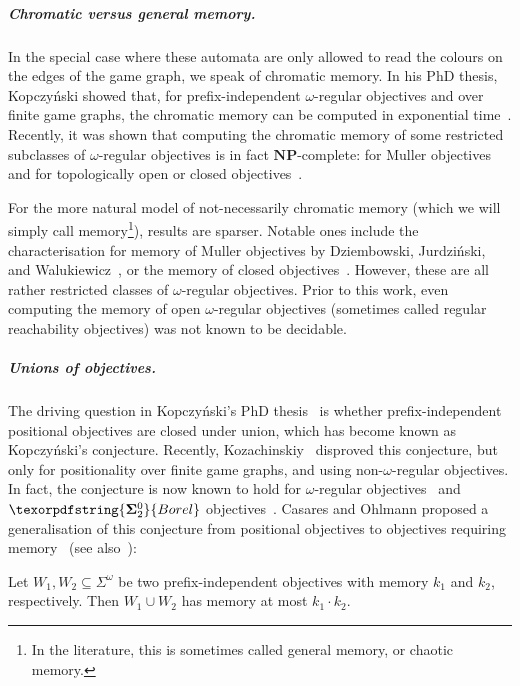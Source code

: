 \documentclass[a4paper,UKenglish,cleveref, thm-restate]{lipics-v2021}
\newcommand{\boldclass}[3]{\texorpdfstring{\ensuremath{\mathbf{#1}^{#2}_{#3}}}{Borel}}
\newcommand{\bsigma}[1]{\boldclass{\Sigma}{0}{#1}}
\newcommand{\NP}{\textbf{NP}}
\newcommand{\oo}{\omega}
\renewcommand{\SS}{\Sigma}
\begin{document}
\subparagraph*{Chromatic versus general memory.}
In the special case where these automata are only allowed to read the colours on the edges of the game graph, we speak of chromatic memory.
In his PhD thesis, Kopczy\'nski showed that, for prefix-independent $\omega$-regular objectives and over finite game graphs, the chromatic memory can be computed in exponential time~\cite[Theorem~8.14]{Kop08Thesis}.
Recently, it was shown that computing the chromatic memory of some restricted subclasses of $\oo$-regular objectives is in fact $\NP$-complete: for Muller objectives~\cite{Casares22Chromatic} and for topologically open or closed objectives~\cite{BFRV23Regular}.


For the more natural model of not-necessarily chromatic memory (which we will simply call memory\footnote{In the literature, this is sometimes called general memory, or chaotic memory.}), results are sparser. Notable ones include the characterisation for memory of Muller objectives by Dziembowski, Jurdzi\'nski, and Walukiewicz~\cite{DJW1997memory}, or the memory of closed objectives~\cite{CFH14}.
However, these are all rather restricted classes of $\omega$-regular objectives.
Prior to this work, even computing the memory of open $\omega$-regular objectives (sometimes called regular reachability objectives) was not known to be decidable.




\subparagraph{Unions of objectives.} The driving question in Kopczyński's PhD thesis~\cite{Kop08Thesis} is whether prefix-independent positional objectives are closed under union, which has become known as Kopczyński's conjecture. Recently, Kozachinskiy~\cite{Kozachinskiy24EnergyGroups} disproved this conjecture, but only for positionality over finite game graphs, and using non-$\oo$-regular objectives. In fact, the conjecture is now known to hold for $\oo$-regular objectives~\cite{CO24Positional} and $\bsigma 2$ objectives~\cite{OS24Sigma2}. 
Casares and Ohlmann proposed a generalisation of this conjecture from positional objectives to objectives requiring memory~\cite[Conjecture~7.1]{CO25LMCS} (see also~\cite[Proposition~8.11]{Kop08Thesis}):

\begin{conjecture}\label{conj:Kopcz-Union-Memory}
	Let $W_1,W_2\subseteq \SS^\oo$ be two prefix-independent objectives with memory $k_1$ and $k_2$, respectively. Then $W_1\cup W_2$ has memory at most $k_1 \cdot k_2$.
\end{conjecture}
\end{document}
